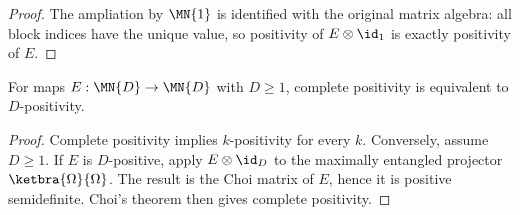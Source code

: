 \begin{proof}
    \leanok
    The ampliation by $\MN{1}$ is identified with the original matrix algebra:
    all block indices have the unique value, so positivity of
    $E\otimes\id_1$ is exactly positivity of $E$.
\end{proof}

\begin{theorem}
    \label{thm:d_positive_iff_completely_positive}
    \leanok
    For maps $E:\MN{D}\to\MN{D}$ with $D\ge 1$, complete positivity is
    equivalent to $D$-positivity.
\end{theorem}

\begin{proof}
    \leanok
    Complete positivity implies $k$-positivity for every $k$. Conversely,
    assume $D\ge 1$. If $E$ is $D$-positive, apply $E\otimes\id_D$ to the
    maximally entangled projector $\ketbra{\Omega}{\Omega}$. The result is
    the Choi matrix of $E$, hence it is positive semidefinite. Choi's theorem
    then gives complete positivity.
\end{proof}
